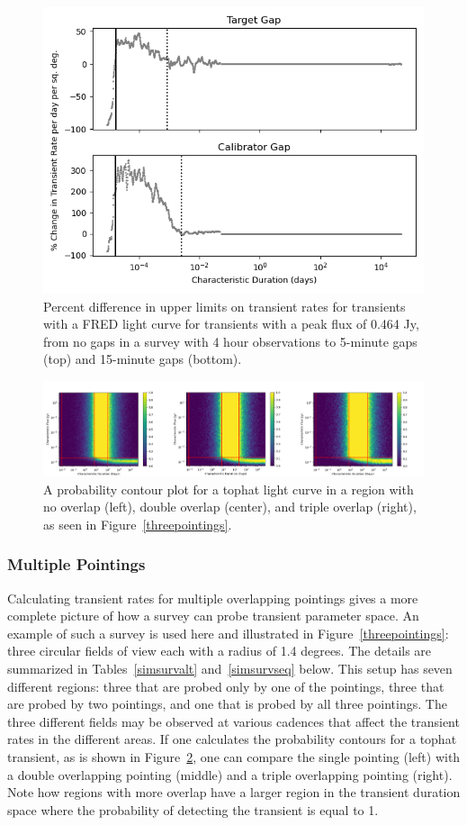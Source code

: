 \documentclass[12pt]{article}
\begin{document}
 \begin{figure}
\includegraphics[width=0.75\columnwidth]{figure8.png}
\caption{Percent difference in upper limits on transient rates for transients with a FRED light curve for transients with a peak flux of 0.464 Jy, from no gaps in a survey with 4 hour observations to 5-minute gaps (top) and 15-minute gaps (bottom).}
\label{fig8}
 \end{figure}
 
 \begin{figure}
\includegraphics[width=\columnwidth]{threeregion_comboplot.png}
\caption{A probability contour plot for a tophat light curve in a region with no overlap (left), double overlap (center), and triple overlap (right), as seen in Figure~\ref{threepointings}. } 
\label{threeregion}
 \end{figure}

\subsubsection{Multiple Pointings}
Calculating transient rates for multiple overlapping pointings gives a more complete picture of how a survey can probe transient parameter space. An example of such a survey is used here and illustrated in Figure~\ref{threepointings}: three circular fields of view each with a radius of 1.4 degrees. The details are summarized in Tables~\ref{simsurvalt} and~\ref{simsurvseq} below. This setup has seven different regions: three that are probed only by one of the pointings, three that are probed by two pointings, and one that is probed by all three pointings. The three different fields may be observed at various cadences that affect the transient rates in the different areas. If one calculates the probability contours for a tophat transient, as is shown in Figure~\ref{threeregion}, one can compare the single pointing (left) with a double overlapping pointing (middle) and a triple overlapping pointing (right). Note how regions with more overlap have a larger region in the transient duration space where the probability of detecting the transient is equal to 1. 
\end{document}
